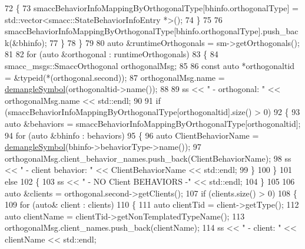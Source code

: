 \begin{DoxyCode}
72                 \{
73                     smaccBehaviorInfoMappingByOrthogonalType[bhinfo.orthogonalType] = 
      std::vector<smacc::StateBehaviorInfoEntry *>();
74                 \}
75 
76                 smaccBehaviorInfoMappingByOrthogonalType[bhinfo.orthogonalType].push\_back(&bhinfo);
77             \}
78         \}
79 
80         \textcolor{keyword}{auto} &runtimeOrthogonals = sm->getOrthogonals();
81 
82         \textcolor{keywordflow}{for} (\textcolor{keyword}{auto} &orthogonal : runtimeOrthogonals)
83         \{
84             smacc\_msgs::SmaccOrthogonal orthogonalMsg;
85 
86             \textcolor{keyword}{const} \textcolor{keyword}{auto} *orthogonaltid = &\textcolor{keyword}{typeid}(*(orthogonal.second));
87             orthogonalMsg.name = \hyperlink{namespacesmacc_1_1introspection_a2f495108db3e57604d8d3ff5ef030302}{demangleSymbol}(orthogonaltid->name());
88 
89             ss << \textcolor{stringliteral}{" - orthogonal: "} << orthogonalMsg.name << std::endl;
90 
91             \textcolor{keywordflow}{if} (smaccBehaviorInfoMappingByOrthogonalType[orthogonaltid].size() > 0)
92             \{
93                 \textcolor{keyword}{auto} &behaviors = smaccBehaviorInfoMappingByOrthogonalType[orthogonaltid];
94                 \textcolor{keywordflow}{for} (\textcolor{keyword}{auto} &bhinfo : behaviors)
95                 \{
96                     \textcolor{keyword}{auto} ClientBehaviorName = \hyperlink{namespacesmacc_1_1introspection_a2f495108db3e57604d8d3ff5ef030302}{demangleSymbol}(bhinfo->behaviorType->name());
97                     orthogonalMsg.client\_behavior\_names.push\_back(ClientBehaviorName);
98                     ss << \textcolor{stringliteral}{"          - client behavior: "} << ClientBehaviorName << std::endl;
99                 \}
100             \}
101             \textcolor{keywordflow}{else}
102             \{
103                 ss << \textcolor{stringliteral}{"          - NO Client BEHAVIORS -"} << std::endl;
104             \}
105 
106             \textcolor{keyword}{auto} &clients = orthogonal.second->getClients();
107             \textcolor{keywordflow}{if} (clients.size() > 0)
108             \{
109                 \textcolor{keywordflow}{for} (\textcolor{keyword}{auto}& client : clients)
110                 \{
111                     \textcolor{keyword}{auto} clientTid = client->getType();
112                     \textcolor{keyword}{auto} clientName = clientTid->getNonTemplatedTypeName();
113                     orthogonalMsg.client\_names.push\_back(clientName);
114                     ss << \textcolor{stringliteral}{"          - client: "} << clientName << std::endl;

\end{DoxyCode}

